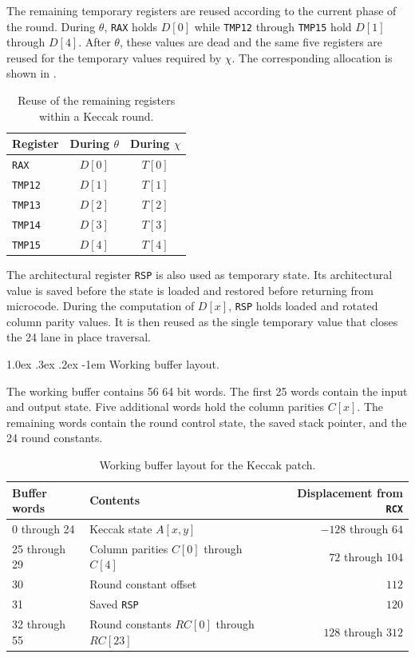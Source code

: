 \documentclass[journal=tches,submission]{iacrtrans}
\makeatletter
\newcommand{\code}[1]{\texttt{#1}}
\renewcommand\paragraph{\@startsection{paragraph}{4}{\z@}%
      {1.0ex \@plus .3ex \@minus .2ex}%
      {-1em}%
      {\normalfont\normalsize\bfseries\SS@parafont}}
\makeatother
\begin{document}
The remaining temporary registers are reused according to the current phase of the round.
During $\theta$, \texttt{RAX} holds $D[0]$ while \texttt{TMP12} through \texttt{TMP15} hold $D[1]$ through $D[4]$.
After $\theta$, these values are dead and the same five registers are reused for the temporary values required by $\chi$.
The corresponding allocation is shown in .

\begin{table}[!ht]
\centering
\caption{Reuse of the remaining registers within a Keccak round.}
\label{tabkeccaktemps}
\begin{tabular}{@{}lcc@{}}
\toprule
Register & During $\theta$ & During $\chi$ \\
\midrule
\code{RAX}   & $D[0]$ & $T[0]$ \\
\code{TMP12} & $D[1]$ & $T[1]$ \\
\code{TMP13} & $D[2]$ & $T[2]$ \\
\code{TMP14} & $D[3]$ & $T[3]$ \\
\code{TMP15} & $D[4]$ & $T[4]$ \\
\bottomrule
\end{tabular}
\end{table}

The architectural register \texttt{RSP} is also used as temporary state.
Its architectural value is saved before the state is loaded and restored before returning from microcode.
During the computation of $D[x]$, \texttt{RSP} holds loaded and rotated column parity values.
It is then reused as the single temporary value that closes the 24 lane in place traversal.

\paragraph{Working buffer layout.}

The working buffer contains 56 64 bit words.
The first 25 words contain the input and output state.
Five additional words hold the column parities $C[x]$.
The remaining words contain the round control state, the saved stack pointer, and the 24 round constants.

\begin{table}[!ht]
\centering
\caption{Working buffer layout for the Keccak patch.}
\label{tabkeccakbuffer}
\begin{tabular}{@{}llr@{}}
\toprule
Buffer words & Contents & Displacement from \code{RCX} \\
\midrule
0 through 24  & Keccak state $A[x,y]$                    & $-128$ through $64$ \\
25 through 29 & Column parities $C[0]$ through $C[4]$    & $72$ through $104$ \\
30            & Round constant offset                    & $112$ \\
31            & Saved \code{RSP}                         & $120$ \\
32 through 55 & Round constants $RC[0]$ through $RC[23]$ & $128$ through $312$ \\
\bottomrule
\end{tabular}
\end{table}
\end{document}
